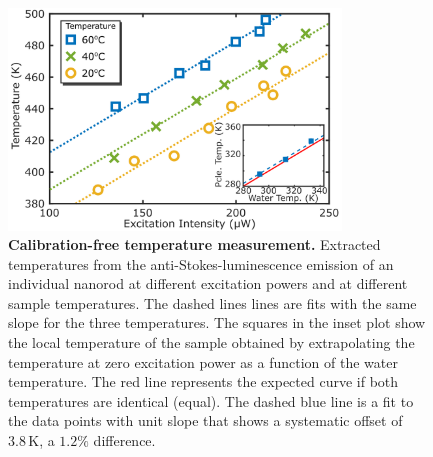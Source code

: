 \documentclass[journal=nalefd,manuscript=letter]{achemso}
\newcommand{\HI}[1]{{#1}} %
\newcommand{\K}{\ensuremath{\,\textrm{K}}}
\begin{document}
\begin{figure}[tp] \centering
\includegraphics[width=88.4mm]{Figures/03_Fit_Of_AS/03_Log_Fit_AS_02.png}
\caption{\textbf{Calibration-free temperature measurement.}
Extracted temperatures from the anti-Stokes-luminescence emission of an individual nanorod
at different excitation powers and at different sample temperatures. 
The dashed lines lines are fits with the same slope for the three temperatures. 
The \HI{squares} in the inset plot show the local temperature of the sample obtained
by extrapolating \HI{the} temperature at zero excitation power as a function of the water temperature.
The red line represents the expected curve if both temperatures are identical (equal). The dashed blue
line is a fit to the data points with unit slope that shows a systematic offset of $3.8\K$, a $1.2\%$ difference.}
	\label{fig:AS_temp}
\end{figure}

\end{document}
